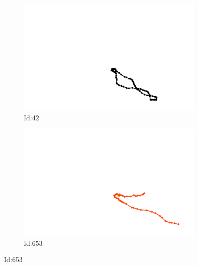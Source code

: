 \documentclass[12pt,twoside]{report}
\begin{document}
\begin{figure}
\centering
\begin{subfigure}[b]{0.20\textwidth}
\centering
\includegraphics[width=\textwidth]{../../trajectories/42.png}
\caption{Id:42}
\end{subfigure}
\begin{subfigure}[b]{0.20\textwidth}
\centering
\includegraphics[width=\textwidth]{../../trajectories/653.png}
\caption{Id:653}
\end{subfigure}
\end{figure}
\end{document}
